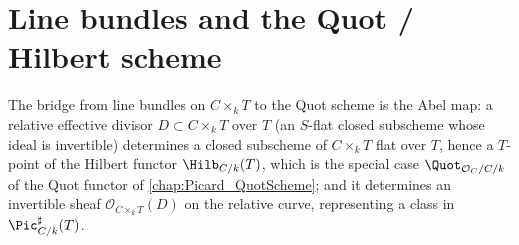 
\section{Line bundles and the Quot / Hilbert scheme}
\label{sec:fga_pic_line_bundle_quot}

The bridge from line bundles on \(C \times_k T\) to the Quot scheme is the
Abel map: a relative effective divisor \(D \subset C \times_k T\) over \(T\)
(an \(S\)-flat closed subscheme whose ideal is invertible) determines a closed
subscheme of \(C \times_k T\) flat over \(T\), hence a \(T\)-point of the Hilbert
functor \(\Hilb_{C/k}(T)\), which is the special case \(\Quot_{\mathcal{O}_C/C/k}\)
of the Quot functor of \cref{chap:Picard_QuotScheme}; and it determines an
invertible sheaf \(\mathcal{O}_{C \times_k T}(D)\) on the relative curve,
representing a class in \(\Pic^\sharp_{C/k}(T)\).

